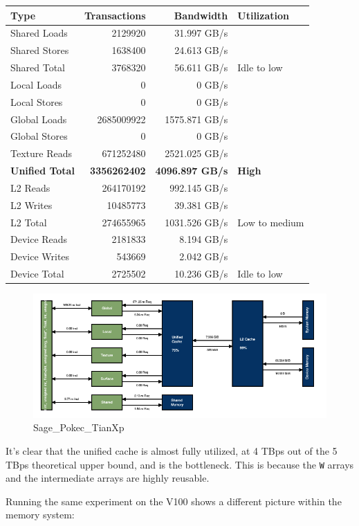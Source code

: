\documentclass[10pt,oneside]{memoir}
\begin{document}
\begin{longtable}[]{@{}lrrl@{}}
\toprule
Type & Transactions & Bandwidth & Utilization\tabularnewline
\midrule
\endhead
Shared Loads & 2129920 & 31.997 GB/s &\tabularnewline
Shared Stores & 1638400 & 24.613 GB/s &\tabularnewline
Shared Total & 3768320 & 56.611 GB/s & Idle to low\tabularnewline
Local Loads & 0 & 0 GB/s &\tabularnewline
Local Stores & 0 & 0 GB/s &\tabularnewline
Global Loads & 2685009922 & 1575.871 GB/s &\tabularnewline
Global Stores & 0 & 0 GB/s &\tabularnewline
Texture Reads & 671252480 & 2521.025 GB/s &\tabularnewline
\textbf{Unified Total} & \textbf{3356262402} & \textbf{4096.897 GB/s} &
\textbf{High}\tabularnewline
L2 Reads & 264170192 & 992.145 GB/s &\tabularnewline
L2 Writes & 10485773 & 39.381 GB/s &\tabularnewline
L2 Total & 274655965 & 1031.526 GB/s & Low to medium\tabularnewline
Device Reads & 2181833 & 8.194 GB/s &\tabularnewline
Device Writes & 543669 & 2.042 GB/s &\tabularnewline
Device Total & 2725502 & 10.236 GB/s & Idle to low\tabularnewline
\bottomrule
\end{longtable}

\begin{figure}
\centering
\includegraphics{attachments/sage/pokec_TitanXp.png}
\caption{Sage\_Pokec\_TianXp}
\end{figure}

It's clear that the unified cache is almost fully utilized, at 4 TBps
out of the 5 TBps theoretical upper bound, and is the bottleneck. This
is because the \texttt{W} arrays and the intermediate arrays are highly
reusable.

Running the same experiment on the V100 shows a different picture within
the memory system:
\end{document}
